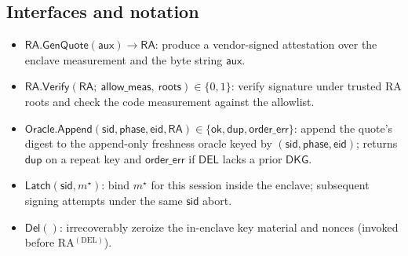 \documentclass[runningheads,orivec]{llncs}
\newcommand{\sid}{\mathsf{sid}}
\begin{document}
\subsection*{Interfaces and notation}
\begin{itemize}[leftmargin=*,itemsep=0.25em]
  \item $\textsf{RA.GenQuote}(\mathsf{aux}) \rightarrow \mathsf{RA}$:
  produce a vendor-signed attestation over the enclave measurement and the byte string $\mathsf{aux}$.

  \item $\textsf{RA.Verify}(\mathsf{RA};\ \textsf{allow\_meas},\ \textsf{roots}) \in \{0,1\}$:
  verify signature under trusted RA roots and check the code measurement against the allowlist.

  \item $\textsf{Oracle.Append}(\mathsf{sid},\mathsf{phase},\mathsf{eid},\mathsf{RA})
  \in \{\mathsf{ok},\mathsf{dup},\mathsf{order\_err}\}$:
  append the quote’s digest to the append-only freshness oracle keyed by $(\mathsf{sid},\mathsf{phase},\mathsf{eid})$;
  returns $\mathsf{dup}$ on a repeat key and $\mathsf{order\_err}$ if $\mathsf{DEL}$ lacks a prior $\mathsf{DKG}$.

  \item $\textsf{Latch}(\sid,m^{\star})$:
  bind $m^{\star}$ for this session inside the enclave; subsequent signing attempts under the same $\sid$ abort.

  \item $\textsf{Del}()$:
  irrecoverably zeroize the in-enclave key material and nonces (invoked before RA$^{(\mathrm{DEL})}$).
\end{itemize}
\end{document}
